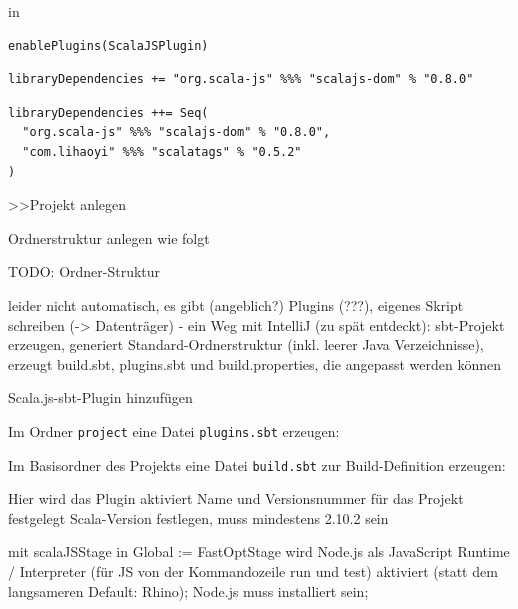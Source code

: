 \documentclass[a4paper, 12pt, hidelinks, listof=totoc, listoftables=totoc, bibliography=totoc]{scrreprt}
\begin{document}
in
\begin{lstlisting}
enablePlugins(ScalaJSPlugin)
\end{lstlisting}

\begin{lstlisting}
libraryDependencies += "org.scala-js" %%% "scalajs-dom" % "0.8.0"
\end{lstlisting}

\begin{lstlisting}
libraryDependencies ++= Seq(
  "org.scala-js" %%% "scalajs-dom" % "0.8.0",
  "com.lihaoyi" %%% "scalatags" % "0.5.2"
)
\end{lstlisting}















>>Projekt anlegen


Ordnerstruktur anlegen wie folgt

TODO: Ordner-Struktur

leider nicht automatisch, es gibt (angeblich?) Plugins (???), eigenes Skript schreiben (-> Datenträger)
	- ein Weg mit IntelliJ (zu spät entdeckt): sbt-Projekt erzeugen, generiert Standard-Ordnerstruktur (inkl. leerer Java Verzeichnisse), erzeugt build.sbt, plugins.sbt und build.properties, die angepasst werden können


Scala.js-sbt-Plugin hinzufügen

Im Ordner \texttt{project} eine Datei \texttt{plugins.sbt} erzeugen:


Im Basisordner des Projekts eine Datei \texttt{build.sbt} zur Build-Definition erzeugen:


Hier wird das Plugin aktiviert
Name und Versionsnummer für das Projekt festgelegt
Scala-Version festlegen, muss mindestens 2.10.2 sein

mit scalaJSStage in Global := FastOptStage wird Node.js als JavaScript Runtime / Interpreter (für JS von der Kommandozeile run und test) aktiviert (statt dem langsameren Default: Rhino); Node.js muss installiert sein;
\end{document}
